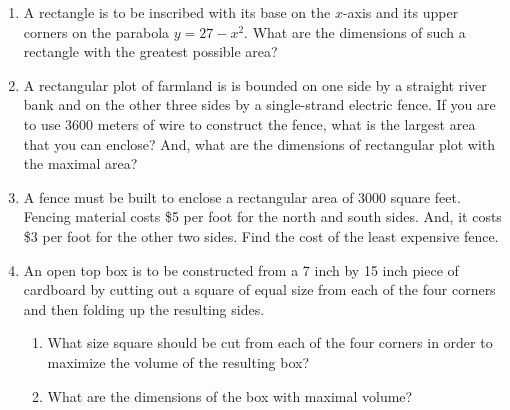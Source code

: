 \documentclass[12pt]{article}
\newif\ifans
\begin{document}
\begin{enumerate}

\item A rectangle is to be inscribed with its base on the $x$-axis and its upper corners on the parabola $y=27-x^2$.  What are the dimensions of such a rectangle with the greatest possible area?

\ifans{\fbox{The dimensions of such a rectangle with the greatest area are 6 by 18.}} \fi

\item A rectangular plot of farmland is is bounded on one side by a straight river bank and on the other three sides by a single-strand electric fence.  If you are to use 3600 meters of wire to construct the fence, what is the largest area that you can enclose?  And, what are the dimensions of rectangular plot with the maximal area?

\ifans{\fbox{\parbox{1\linewidth}{The side parallel to the river should be 1800 meters long.  The remaining two sides of the fence should each be 900 meters long.  The maximal encolsed area is 1,620,000 square meters.}}} \fi

\item A fence must be built to enclose a rectangular area of 3000 square feet.  Fencing material costs \$5 per foot for the north and south sides.  And, it costs \$3 per foot for the other two sides.  Find the cost of the least expensive fence.

\ifans{\fbox{The least expensive fence costs \$$600\sqrt{2}$ which is approximately \$848.53.}} \fi

\item An open top box is to be constructed from a 7 inch by 15 inch piece of cardboard by cutting out a square of equal size from each of the four corners and then folding up the resulting sides.

\begin{enumerate}

\item What size square should be cut from each of the four corners in order to maximize the volume of the resulting box?

\ifans{\fbox{A square with a side length of 1.5 inches should be cut from each corner.}} \fi

\item What are the dimensions of the box with maximal volume?

\ifans{\fbox{1.5 inches by 4 inches by 12 inches}} \fi


\end{enumerate}
\end{enumerate}
\end{document}
